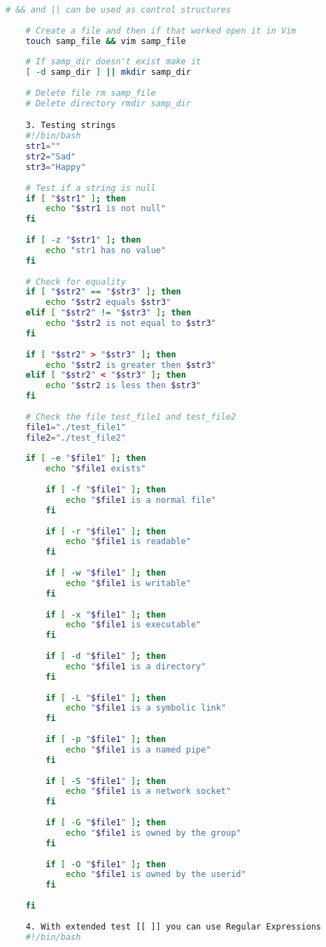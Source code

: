 \begin{lstlisting}[language=bash,caption={basics of bash}]
 	# && and || can be used as control structures
 	
 	# Create a file and then if that worked open it in Vim
 	touch samp_file && vim samp_file
 	
 	# If samp_dir doesn't exist make it
 	[ -d samp_dir ] || mkdir samp_dir
 	
 	# Delete file rm samp_file
 	# Delete directory rmdir samp_dir

	3. Testing strings
	#!/bin/bash
	str1=""
	str2="Sad"
	str3="Happy"
	
	# Test if a string is null
	if [ "$str1" ]; then
		echo "$str1 is not null"
	fi
	
	if [ -z "$str1" ]; then
		echo "str1 has no value"
	fi
	
	# Check for equality
	if [ "$str2" == "$str3" ]; then
		echo "$str2 equals $str3"
	elif [ "$str2" != "$str3" ]; then
		echo "$str2 is not equal to $str3"
	fi
	
	if [ "$str2" > "$str3" ]; then
		echo "$str2 is greater then $str3"
	elif [ "$str2" < "$str3" ]; then
		echo "$str2 is less then $str3"
	fi
	
	# Check the file test_file1 and test_file2
	file1="./test_file1"
	file2="./test_file2"
	
	if [ -e "$file1" ]; then
		echo "$file1 exists"
		
		if [ -f "$file1" ]; then
			echo "$file1 is a normal file"
		fi
		
		if [ -r "$file1" ]; then
			echo "$file1 is readable"
		fi
		
		if [ -w "$file1" ]; then
			echo "$file1 is writable"
		fi
		
		if [ -x "$file1" ]; then
			echo "$file1 is executable"
		fi
		
		if [ -d "$file1" ]; then
			echo "$file1 is a directory"
		fi
		
		if [ -L "$file1" ]; then
			echo "$file1 is a symbolic link"
		fi
		
		if [ -p "$file1" ]; then
			echo "$file1 is a named pipe"
		fi
		
		if [ -S "$file1" ]; then
			echo "$file1 is a network socket"
		fi
		
		if [ -G "$file1" ]; then
			echo "$file1 is owned by the group"
		fi
		
		if [ -O "$file1" ]; then
			echo "$file1 is owned by the userid"
		fi
		
	fi
	
	4. With extended test [[ ]] you can use Regular Expressions
	#!/bin/bash
	

\end{lstlisting}
